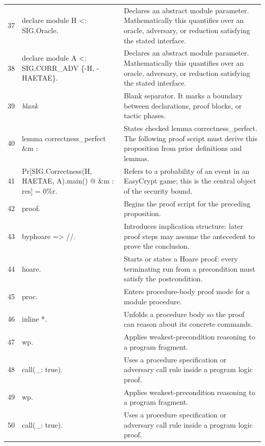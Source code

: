 \documentclass[10pt]{article}
\begin{document}
\begin{longtable}{r L{0.53\textwidth} L{0.37\textwidth}}
37 & {\ttfamily\scriptsize declare module H <: SIG.Oracle.} & Declares an abstract module parameter.  Mathematically this quantifies over an oracle, adversary, or reduction satisfying the stated interface. \\
38 & {\ttfamily\scriptsize declare module A <: SIG.CORR\_ADV \{-H, -HAETAE\}.} & Declares an abstract module parameter.  Mathematically this quantifies over an oracle, adversary, or reduction satisfying the stated interface. \\
39 & {\ttfamily\scriptsize \emph{blank}} & Blank separator.  It marks a boundary between declarations, proof blocks, or tactic phases. \\
40 & {\ttfamily\scriptsize lemma correctness\_perfect \&m :} & States checked lemma correctness\_perfect.  The following proof script must derive this proposition from prior definitions and lemmas. \\
41 & {\ttfamily\scriptsize   Pr[SIG.Correctness(H, HAETAE, A).main() @ \&m : res] = 0\%r.} & Refers to a probability of an event in an EasyCrypt game; this is the central object of the security bound. \\
42 & {\ttfamily\scriptsize proof.} & Begins the proof script for the preceding proposition. \\
43 & {\ttfamily\scriptsize byphoare => //.} & Introduces implication structure: later proof steps may assume the antecedent to prove the conclusion. \\
44 & {\ttfamily\scriptsize hoare.} & Starts or states a Hoare proof: every terminating run from a precondition must satisfy the postcondition. \\
45 & {\ttfamily\scriptsize proc.} & Enters procedure-body proof mode for a module procedure. \\
46 & {\ttfamily\scriptsize inline *.} & Unfolds a procedure body so the proof can reason about its concrete commands. \\
47 & {\ttfamily\scriptsize wp.} & Applies weakest-precondition reasoning to a program fragment. \\
48 & {\ttfamily\scriptsize call(\_: true).} & Uses a procedure specification or adversary call rule inside a program logic proof. \\
49 & {\ttfamily\scriptsize wp.} & Applies weakest-precondition reasoning to a program fragment. \\
50 & {\ttfamily\scriptsize call(\_: true).} & Uses a procedure specification or adversary call rule inside a program logic proof. \\

\end{longtable}
\end{document}

